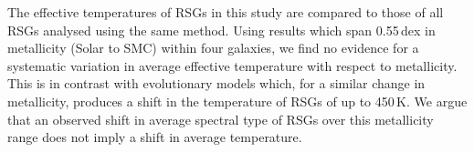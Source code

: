 The effective temperatures of RSGs in this study are compared to those of all RSGs analysed using the same method.
Using results which span 0.55\,dex in metallicity (Solar to SMC) within four galaxies, we find no evidence for a systematic variation in average effective temperature with respect to metallicity.
This is in contrast with evolutionary models which, for a  similar change in metallicity, produces a shift in the temperature of RSGs of up to 450\,K.
We argue that an observed shift in average spectral type of RSGs over this metallicity range does not imply a shift in average temperature.

